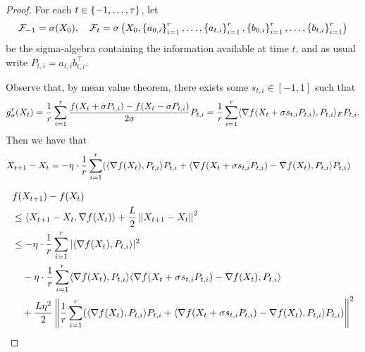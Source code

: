 \begin{proof}
For each $t \in \left\{-1, \ldots, \tau\right\}$, let
\begin{align*}
    \mathcal F_{-1} = \sigma(X_0), \quad \mathcal F_t = \sigma \left(X_0, \left\{a_{0,i}\right\}_{i=1}^r, \ldots, \left\{a_{t,i}\right\}_{i=1}^r, \left\{b_{0,i}\right\}_{i=1}^r, \ldots, \left\{b_{t,i}\right\}_{i=1}^r \right)        
\end{align*}
be the sigma-algebra containing the information available at time $t$, and as usual write $P_{t,i} = a_{t,i}b_{t,i}^\top$. 

Observe that, by mean value theorem, there exists some $s_{t,i} \in [-1,1]$ such that 
\begin{align*}
    g_\sigma^r(X_t) = \frac 1r \sum_{i=1}^r \frac{f(X_t+\sigma P_{t,i}) - f(X_t - \sigma P_{t,i})}{2 \sigma} P_{t,i} = \frac{1}{r} \sum_{i=1}^r \langle\nabla f(X_t+\sigma s_{t,i} P_{t,i}),P_{t,i}\rangle_F P_{t,i}.
\end{align*}
Then we have that
\begin{align*}
    X_{t+1}-X_t &= - \eta \cdot \frac 1r \sum_{i=1}^r(\langle \nabla f(X_t), P_{t,i} \rangle P_{t,i} + \langle \nabla f(X_t+\sigma s_{t,i} P_{t,i}) - \nabla f(X_t), P_{t,i} \rangle P_{t,i})
\end{align*}

\begin{align*}
    &f(X_{t+1}) - f(X_t) 
    \\&\leq  \langle X_{t+1} - X_t, \nabla f(X_t) \rangle + \frac L2 \left\lVert X_{t+1} - X_t \right\rVert^2 \\
    &\leq - \eta \cdot \frac{1}{r} \sum_{i=1}^r |\langle \nabla f(X_t), P_{t,i} \rangle|^2 
    \\& \quad - \eta \cdot \frac{1}{r} \sum_{i=1}^r \langle \nabla f(X_t), P_{t,i} \rangle \langle \nabla f(X_t + \sigma s_{t,i} P_{t,i}) - \nabla f(X_t), P_{t,i} \rangle \\
    &\quad + \frac {L\eta^2}{2} \left \|\frac 1r \sum_{i=1}^r(\langle \nabla f(X_t), P_{t,i} \rangle P_{t,i} + \langle \nabla f(X_t+\sigma s_{t,i} P_{t,i}) - \nabla f(X_t), P_{t,i} \rangle P_{t,i}) \right \|^2
\end{align*}


\end{proof}
